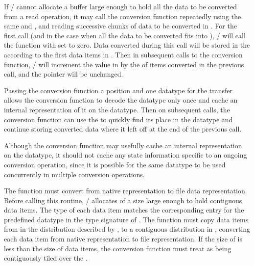 If \MPI/ cannot allocate a buffer large enough to hold
all the data to be converted from a read operation, it may
call the conversion function repeatedly using the same 
and ,
and reading successive chunks of data to be
converted in .  For the first call (and in
the case when all the data to be converted fits into
), \MPI/ will call the function with 
 set to zero.  Data converted during this
call will be stored in the  according to
the first  data items in .  Then
in subsequent calls to the conversion function, \MPI/ will
increment the value in  by the  of
items converted in the previous
call, and the  pointer will be unchanged. 

\begin{rationale}
Passing the conversion function a position and one datatype for the transfer
allows the conversion function to decode the datatype only once and
cache an internal representation of it on the datatype.
Then on subsequent calls, the conversion function can use the 
to quickly find its place in the datatype and continue
storing converted data where it left off at the end of the previous call.
\end{rationale}

\begin{users}
Although the conversion function may usefully cache an
internal representation on the datatype, it should not cache
any state information specific to an ongoing conversion
operation, since it is possible for the same datatype to
be used concurrently in multiple conversion operations.
\end{users}

The function  must convert from
native representation to file data representation.
Before calling this routine,
\MPI/ allocates  of a size large enough to hold 
contiguous data items.
The type of each data item matches the
corresponding entry for the predefined datatype
in the type signature of .
The function must copy  data items from
 in the distribution described by 
,
to a contiguous distribution in , converting each data item
from native representation to file representation.
If the size of  is less than the size
of 
data items,
the conversion function must treat
 as being contiguously tiled over the
.

